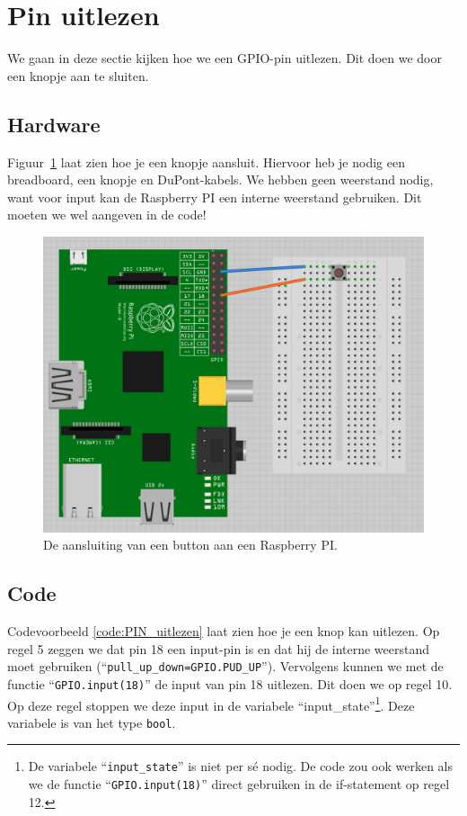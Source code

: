 \documentclass{guide}
\begin{document}
\section{Pin uitlezen}
\label{sec:pin_uitlezen}
We gaan in deze sectie kijken hoe we een GPIO-pin uitlezen. Dit doen we door een knopje aan te sluiten.

\subsection{Hardware}
Figuur~\ref{fig:PI_and_button} laat zien hoe je een knopje aansluit. Hiervoor heb je nodig een breadboard, een knopje en DuPont-kabels. We hebben geen weerstand nodig, want voor input kan de Raspberry PI een interne weerstand gebruiken. Dit moeten we wel aangeven in de code!

\begin{figure}[ht]
\centering
\includegraphics[scale=0.6]{images/PI_and_button.png}
\caption{De aansluiting van een button aan een Raspberry PI.} \label{fig:PI_and_button}
\end{figure}

\subsection{Code}
Codevoorbeeld \ref{code:PIN_uitlezen} laat zien hoe je een knop kan uitlezen. Op regel 5 zeggen we dat pin 18 een input-pin is en dat hij de interne weerstand moet gebruiken (\enquote{\texttt{pull\_up\_down=GPIO.PUD\_UP}}). Vervolgens kunnen we met de functie \enquote{\texttt{GPIO.input(18)}} de input van pin 18 uitlezen. Dit doen we op regel 10. Op deze regel stoppen we deze input in de variabele \enquote{input\_state}\footnote{De variabele \enquote{\texttt{input\_state}} is niet per s\'{e} nodig. De code zou ook werken als we de functie \enquote{\texttt{GPIO.input(18)}} direct gebruiken in de if-statement op regel 12.}. Deze variabele is van het type \texttt{bool}.
\end{document}
